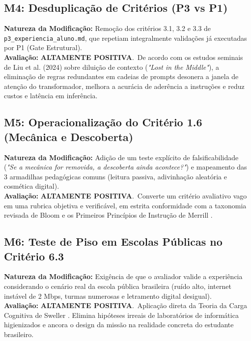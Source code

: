 \documentclass[11pt,a4paper]{article}
\begin{document}
\subsection{M4: Desduplicação de Critérios (P3 vs P1)}
\textbf{Natureza da Modificação:} Remoção dos critérios 3.1, 3.2 e 3.3 de \texttt{p3\_experiencia\_aluno.md}, que repetiam integralmente validações já executadas por P1 (Gate Estrutural).\\
\textbf{Avaliação:} \color{DarkGreen}\textbf{ALTAMENTE POSITIVA}.\normalfont\ De acordo com os estudos seminais de Liu et al. (2024) \cite{liu2024lost} sobre diluição de contexto (\textit{"Lost in the Middle"}), a eliminação de regras redundantes em cadeias de prompts desonera a janela de atenção do transformador, melhora a acurácia de aderência a instruções e reduz custos e latência em inferência.

\subsection{M5: Operacionalização do Critério 1.6 (Mecânica e Descoberta)}
\textbf{Natureza da Modificação:} Adição de um teste explícito de falsificabilidade (\textit{"Se a mecânica for removida, a descoberta ainda acontece?"}) e mapeamento das 3 armadilhas pedagógicas comuns (leitura passiva, adivinhação aleatória e cosmética digital).\\
\textbf{Avaliação:} \color{DarkGreen}\textbf{ALTAMENTE POSITIVA}.\normalfont\ Converte um critério avaliativo vago em uma rubrica objetiva e verificável, em estrita conformidade com a taxonomia revisada de Bloom \cite{anderson2001taxonomy} e os Primeiros Princípios de Instrução de Merrill \cite{merrill2002first}.

\subsection{M6: Teste de Piso em Escolas Públicas no Critério 6.3}
\textbf{Natureza da Modificação:} Exigência de que o avaliador valide a experiência considerando o cenário real da escola pública brasileira (ruído alto, internet instável de 2 Mbps, turmas numerosas e letramento digital desigual).\\
\textbf{Avaliação:} \color{DarkGreen}\textbf{ALTAMENTE POSITIVA}.\normalfont\ Aplicação direta da Teoria da Carga Cognitiva de Sweller \cite{sweller1988cognitive,paas2003cognitive,sweller2011cognitive}. Elimina hipóteses irreais de laboratórios de informática higienizados e ancora o design da missão na realidade concreta do estudante brasileiro.
\end{document}
